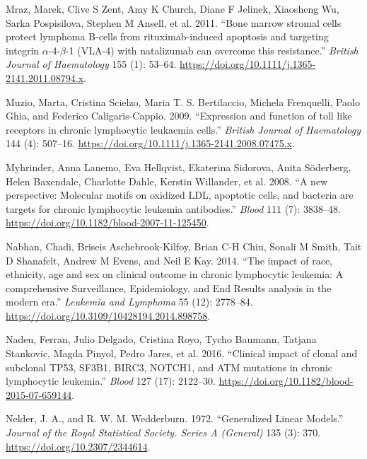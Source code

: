 \documentclass[11pt, a4paper, twosided]{book}
\newenvironment{CSLReferences}%
  {}%
  {\par}
\begin{document}
\begin{CSLReferences}{1}{0}
\leavevmode{}%
Mraz, Marek, Clive S Zent, Amy K Church, Diane F Jelinek, Xiaosheng Wu, Sarka Pospisilova, Stephen M Ansell, et al. 2011. {``{Bone marrow stromal cells protect lymphoma B-cells from rituximab-induced apoptosis and targeting integrin \(\alpha\)-4-\(\beta\)-1 (VLA-4) with natalizumab can overcome this resistance}.''} \emph{British Journal of Haematology} 155 (1): 53--64. \url{https://doi.org/10.1111/j.1365-2141.2011.08794.x}.

\leavevmode{}%
Muzio, Marta, Cristina Scielzo, Maria T. S. Bertilaccio, Michela Frenquelli, Paolo Ghia, and Federico Caligaris-Cappio. 2009. {``{Expression and function of toll like receptors in chronic lymphocytic leukaemia cells}.''} \emph{British Journal of Haematology} 144 (4): 507--16. \url{https://doi.org/10.1111/j.1365-2141.2008.07475.x}.

\leavevmode{}%
Myhrinder, Anna Lanemo, Eva Hellqvist, Ekaterina Sidorova, Anita Söderberg, Helen Baxendale, Charlotte Dahle, Kerstin Willander, et al. 2008. {``{A new perspective: Molecular motifs on oxidized LDL, apoptotic cells, and bacteria are targets for chronic lymphocytic leukemia antibodies}.''} \emph{Blood} 111 (7): 3838--48. \url{https://doi.org/10.1182/blood-2007-11-125450}.

\leavevmode{}%
Nabhan, Chadi, Briseis Aschebrook-Kilfoy, Brian C-H Chiu, Sonali M Smith, Tait D Shanafelt, Andrew M Evens, and Neil E Kay. 2014. {``{The impact of race, ethnicity, age and sex on clinical outcome in chronic lymphocytic leukemia: A comprehensive Surveillance, Epidemiology, and End Results analysis in the modern era}.''} \emph{Leukemia and Lymphoma} 55 (12): 2778--84. \url{https://doi.org/10.3109/10428194.2014.898758}.

\leavevmode{}%
Nadeu, Ferran, Julio Delgado, Cristina Royo, Tycho Baumann, Tatjana Stankovic, Magda Pinyol, Pedro Jares, et al. 2016. {``{Clinical impact of clonal and subclonal TP53, SF3B1, BIRC3, NOTCH1, and ATM mutations in chronic lymphocytic leukemia.}''} \emph{Blood} 127 (17): 2122--30. \url{https://doi.org/10.1182/blood-2015-07-659144}.

\leavevmode{}%
Nelder, J. A., and R. W. M. Wedderburn. 1972. {``{Generalized Linear Models}.''} \emph{Journal of the Royal Statistical Society. Series A (General)} 135 (3): 370. \url{https://doi.org/10.2307/2344614}.


\end{CSLReferences}
\end{document}
